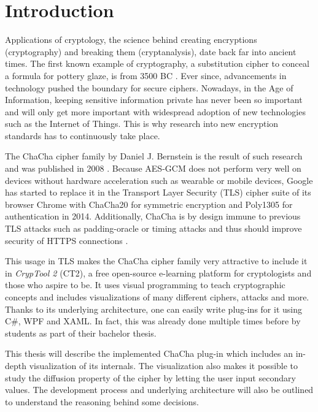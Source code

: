 
\chapter{Introduction}

Applications of cryptology, the science behind creating encryptions (cryptography) and breaking them (cryptanalysis), date back far into ancient times. The first known example of  cryptography, a substitution cipher to conceal a formula for pottery glaze, is from 3500 BC \cite{history}. Ever since, advancements in technology pushed the boundary for secure ciphers. Nowadays, in the Age of Information, keeping sensitive information private has never been so important and will only get more important with widespread adoption of new technologies such as the Internet of Things. This is why research into new encryption standards has to continuously take place.

The ChaCha cipher family by Daniel J. Bernstein is the result of such research and was published in 2008 \cite{chachaspec}. Because AES-GCM does not perform very well on devices without hardware acceleration such as wearable or mobile devices, Google has started to replace it in the Transport Layer Security (TLS) cipher suite of its browser Chrome with ChaCha20 for symmetric encryption and Poly1305 for authentication in 2014. Additionally, ChaCha is by design immune to previous TLS attacks such as padding-oracle or timing attacks and thus should improve security of HTTPS connections \cite{googlesecurityblog}.

This usage in TLS makes the ChaCha cipher family very attractive to include it in \textit{CrypTool 2} (CT2), a free open-source e-learning platform for cryptologists and those who aspire to be. It uses visual programming to teach cryptographic concepts and includes visualizations of many different ciphers, attacks and more. Thanks to its underlying architecture, one can easily write plug-ins for it using C\#, WPF and XAML. In fact, this was already done multiple times before by students as part of their bachelor thesis.

This thesis will describe the implemented ChaCha plug-in which includes an in-depth visualization of its internals. The visualization also makes it possible to study the diffusion property of the cipher by letting the user input secondary values. The development process and underlying architecture will also be outlined to understand the reasoning behind some decisions.